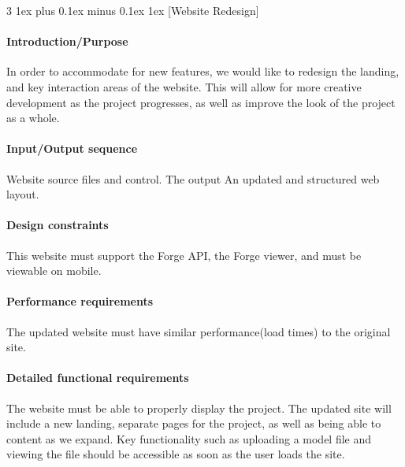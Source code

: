 \documentclass[letterpaper, 10pt, draftclsnofoot, compsoc, onecolumn]{IEEEtran}
\makeatletter
\def\subsubsection{\@startsection{subsubsection}%
                                 {3}%
                                 {\z@}%
                                 {1ex plus 0.1ex minus 0.1ex}%
                                 {1ex}%
                                 {\normalfont\normalsize}}%
\makeatother
\begin{document}

\subsubsection[{Website Redesign}]{\rmfamily\bfseries\color{black} }

\paragraph[Introduction/Purpose of this
feature]{\rmfamily\bfseries\color{black}
Introduction/Purpose }
	In order to accommodate for new features, we would like to redesign the landing, and key interaction areas of the website. 
	This will allow for more creative development as the project progresses, as well as improve the look of the project as a whole.

\smallskip
\paragraph[Input/Output sequence]{\rmfamily\bfseries\color{black}
Input/Output sequence }
	Website source files and control. The output An updated and structured web layout.

\paragraph[Design constraints]{\rmfamily\bfseries\color{black} Design
constraints }
	This website must support the Forge API, the Forge viewer, and must be viewable on mobile. 

\paragraph[Performance requirements]{\rmfamily\bfseries\color{black}
Performance requirements }
	The updated website must have similar performance(load times) to the original site.

\paragraph[Detailed functional requirements]{\rmfamily\bfseries\color{black}
Detailed functional requirements }
	The website must be able to properly display the project. The updated site will include a new landing,
	separate pages for the project, as well as being able to content as we expand. Key functionality such as uploading
	a model file and viewing the file should be accessible as soon as the user loads the site.   
\end{document}
